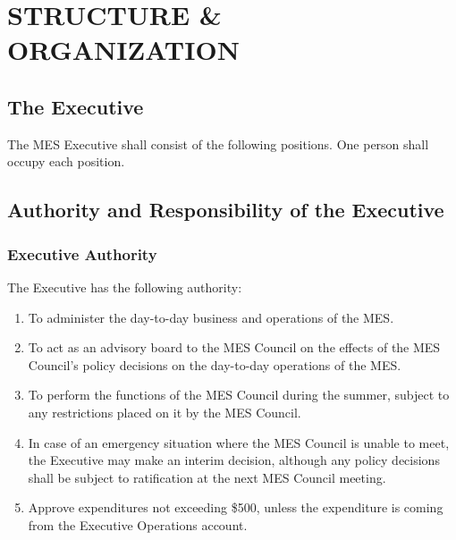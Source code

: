 \section{STRUCTURE \& ORGANIZATION}
\label{structure-organization}

\subsection{The Executive}
\label{the-executive}

The MES Executive shall consist of the following positions. One person
shall occupy each position.









\subsection{Authority and Responsibility of the
 Executive}
\label{authority-and-responsibility-of-the-executive}
\subsubsection{Executive Authority}
\label{executive-authority}

The Executive has the following authority:

\begin{enumerate}
 \item
  To administer the day-to-day business and operations of the MES.
 \item
  To act as an advisory board to the MES Council on the effects of the
  MES Council's policy decisions on the day-to-day operations of the
  MES.
 \item
  To perform the functions of the MES Council during the summer, subject
  to any restrictions placed on it by the MES Council.
 \item
  In case of an emergency situation where the MES Council is unable to
  meet, the Executive may make an interim decision, although any policy
  decisions shall be subject to ratification at the next MES Council
  meeting.
 \item
  Approve expenditures not exceeding \$500, unless the expenditure is
  coming from the Executive Operations account.

\end{enumerate}

